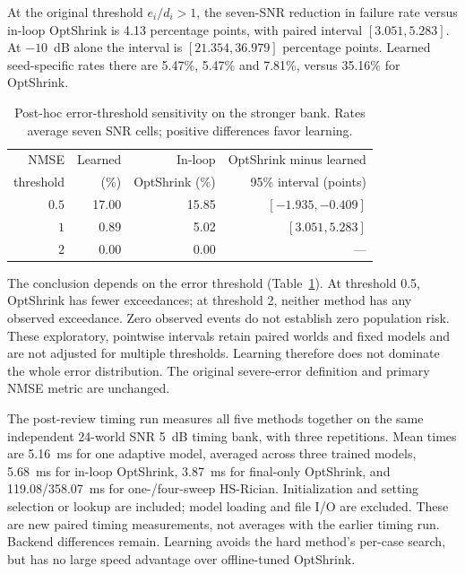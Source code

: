 At the original threshold $e_i/d_i>1$, the seven-SNR reduction in
failure rate versus in-loop OptShrink is
4.13
percentage points, with paired interval
$[3.051,5.283]$.
At $-10$~dB alone the interval is
$[21.354,36.979]$
percentage points. Learned seed-specific rates there are
5.47\%, 5.47\% and 7.81\%, versus 35.16\% for OptShrink.

\begin{table}[!t]
\caption{Post-hoc error-threshold sensitivity on the stronger bank.
Rates average seven SNR cells; positive differences favor learning.}
\label{tab:supp_tails}\centering\footnotesize\setlength{\tabcolsep}{3pt}
\begin{tabular}{@{}rrrr@{}}\toprule
NMSE & Learned & In-loop & OptShrink minus learned\\
threshold & (\%) & OptShrink (\%) & 95\% interval (points)\\\midrule
$0.5$ & 17.00 & 15.85 & $[-1.935,-0.409]$\\
$1$ & 0.89 & 5.02 & $[3.051,5.283]$\\
$2$ & 0.00 & 0.00 & ---\\
\bottomrule\end{tabular}
\end{table}
The conclusion depends on the error threshold (Table~\ref{tab:supp_tails}).
At threshold 0.5, OptShrink has fewer exceedances; at threshold 2,
neither method has any observed exceedance. Zero observed events do not
establish zero population risk. These exploratory, pointwise intervals
retain paired worlds and fixed models and are not adjusted for multiple
thresholds. Learning therefore does not dominate the whole error
distribution. The original severe-error definition and primary NMSE
metric are unchanged.

The post-review timing run measures all five methods together on the
same independent 24-world SNR 5~dB timing bank, with three repetitions.
Mean times are 5.16~ms for one adaptive model,
averaged across three trained models, 5.68~ms
for in-loop OptShrink, 3.87~ms for final-only
OptShrink, and 119.08/358.07~ms
for one-/four-sweep HS-Rician. Initialization and setting selection or
lookup are included; model loading and file I/O are excluded. These are
new paired timing measurements, not averages with the earlier timing run.
Backend differences remain. Learning avoids the hard method's per-case
search, but has no large speed advantage over offline-tuned OptShrink.


